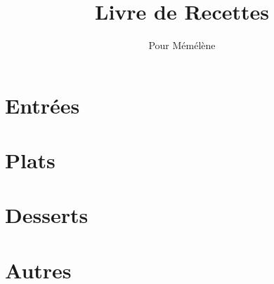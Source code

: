 \documentclass{recipe-book}
\title{Livre de Recettes}
\author{Pour Mémélène}
\date{}
\begin{document}
%

\chapter{Entrées}
%
\chapter{Plats}

\chapter{Desserts}

\chapter{Autres}
\end{document}
